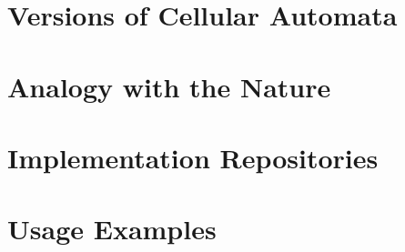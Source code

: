 \documentclass[9pt,a4paper,twoside]{tau-class/tau}
\begin{document}
\section{Versions of Cellular Automata}

\section{Analogy with the Nature}
    
\section{Implementation Repositories}

\section{Usage Examples}
\end{document}

